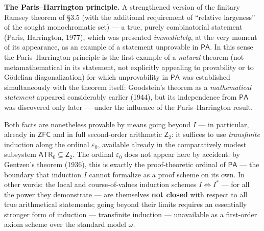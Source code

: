 \documentclass[12pt,a4paper]{article}
\theoremstyle{plain}
\theoremstyle{definition}
\newcommand{\PA}{\textsf{PA}}
\newcommand{\Ztwo}{\textsf{Z}_2}
\newcommand{\ZFC}{\textsf{ZFC}}
\begin{document}
\textbf{The Paris--Harrington principle.} A strengthened version of the finitary Ramsey theorem of §3.5 (with the additional requirement of ``relative largeness'' of the sought monochromatic set) --- a true, purely combinatorial statement (Paris, Harrington, 1977), which was presented \emph{immediately}, at the very moment of its appearance, as an example of a statement unprovable in $\PA$. In this sense the Paris--Harrington principle is the first example of a \emph{natural} theorem (not metamathematical in its statement, not explicitly appealing to provability or to Gödelian diagonalization) for which unprovability in $\PA$ was established simultaneously with the theorem itself: Goodstein's theorem as a \emph{mathematical statement} appeared considerably earlier (1944), but its independence from $\PA$ was discovered only later --- under the influence of the Paris--Harrington result.

Both facts are nonetheless provable by means going beyond $I$ --- in particular, already in $\ZFC$ and in full second-order arithmetic $\Ztwo$: it suffices to use \emph{transfinite} induction along the ordinal $\varepsilon_0$, available already in the comparatively modest subsystem $\textsf{ATR}_0\subseteq\Ztwo$. The ordinal $\varepsilon_0$ does not appear here by accident: by Gentzen's theorem (1936), this is exactly the proof-theoretic ordinal of $\PA$ --- the boundary that induction $I$ cannot formalize as a proof scheme on its own. In other words: the local and course-of-values induction schemes $I\iff I^*$ --- for all the power they demonstrate --- are themselves \textbf{not closed} with respect to all true arithmetical statements; going beyond their limits requires an essentially stronger form of induction --- transfinite induction --- unavailable as a first-order axiom scheme over the standard model $\omega$.
\end{document}
